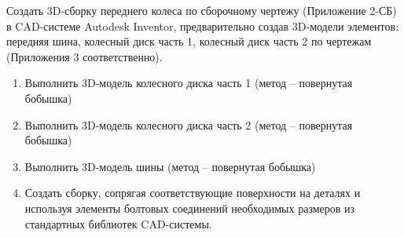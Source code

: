 
Создать 3D-сборку переднего колеса по сборочному чертежу (Приложение 2-СБ) в CAD-системе Autodesk Inventor, предварительно создав 3D-модели элементов: передняя шина, колесный диск часть 1, колесный диск часть 2 по чертежам (Приложения 3 соответственно).





\explaneSection

\begin{enumerate}
    \item Выполнить 3D-модель колесного диска часть 1 (метод – повернутая бобышка)
    \item Выполнить 3D-модель колесного диска часть 2 (метод – повернутая бобышка)
    \item Выполнить 3D-модель шины (метод – повернутая бобышка)
    \item Создать сборку, сопрягая соответствующие поверхности на деталях и используя элементы болтовых соединений необходимых размеров из стандартных библиотек CAD-системы.
\end{enumerate}    